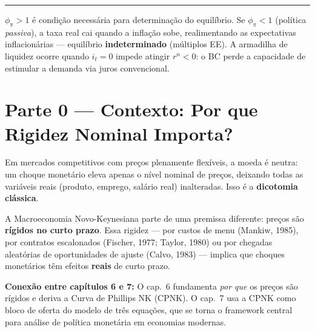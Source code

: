 \documentclass[12pt, a4paper]{article}
\begin{document}
\rule{\linewidth}{0.6pt}

\vspace{0.5em}
\begin{provabox}[title={Princípio de Taylor --- Alerta de Prova}]
\textbf{$\phi_\pi > 1$} é condição necessária para determinação do equilíbrio.
Se $\phi_\pi < 1$ (política \emph{passiva}), a taxa real cai quando a inflação sobe,
realimentando as expectativas inflacionárias --- equilíbrio \textbf{indeterminado}
(múltiplos EE). A armadilha de liquidez ocorre quando $i_t = 0$ impede atingir
$r^n < 0$: o BC perde a capacidade de estimular a demanda via juros convencional.
\end{provabox}

\newpage
\tableofcontents
\newpage


\section*{\large\color{cyanrbc} Parte 0 --- Contexto: Por que Rigidez Nominal Importa?}

Em mercados competitivos com preços plenamente flexíveis, a moeda é neutra: um choque
monetário eleva apenas o nível nominal de preços, deixando todas as variáveis reais
(produto, emprego, salário real) inalteradas. Isso é a \textbf{dicotomia clássica}.

A Macroeconomia Novo-Keynesiana parte de uma premissa diferente: preços são
\textbf{rígidos no curto prazo}. Essa rigidez --- por custos de menu (Mankiw, 1985),
por contratos escalonados (Fischer, 1977; Taylor, 1980) ou por chegadas aleatórias de
oportunidades de ajuste (Calvo, 1983) --- implica que choques monetários têm efeitos
\textbf{reais} de curto prazo.

\textbf{Conexão entre capítulos 6 e 7:} O cap.\ 6 fundamenta \emph{por que} os preços
são rígidos e deriva a Curva de Phillips NK (CPNK). O cap.\ 7 usa a CPNK como bloco de
oferta do modelo de três equações, que se torna o framework central para análise de
política monetária em economias modernas.
\end{document}
